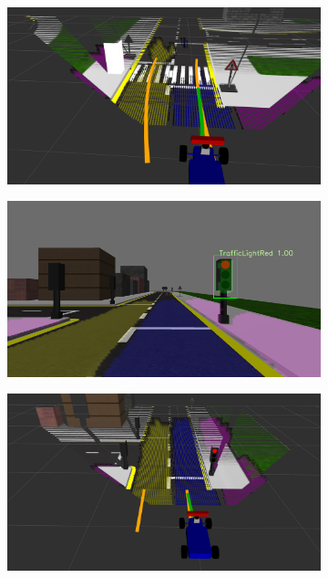 \begin{figure}[h]
\begin{subfigure}[b]{0.45\linewidth}
  \end{subfigure}
  \begin{subfigure}[b]{0.45\linewidth}
    \includegraphics[width=\linewidth]{figures/experiments/cross-road-go-pc.png}
  \end{subfigure}
  \begin{subfigure}[b]{0.45\linewidth}
    \includegraphics[width=\linewidth]{figures/experiments/red-light-stop-img.png}
  \end{subfigure}
  \begin{subfigure}[b]{0.45\linewidth}
    \includegraphics[width=\linewidth]{figures/experiments/red-light-stop-pc.png}

\end{subfigure}
\end{figure}
